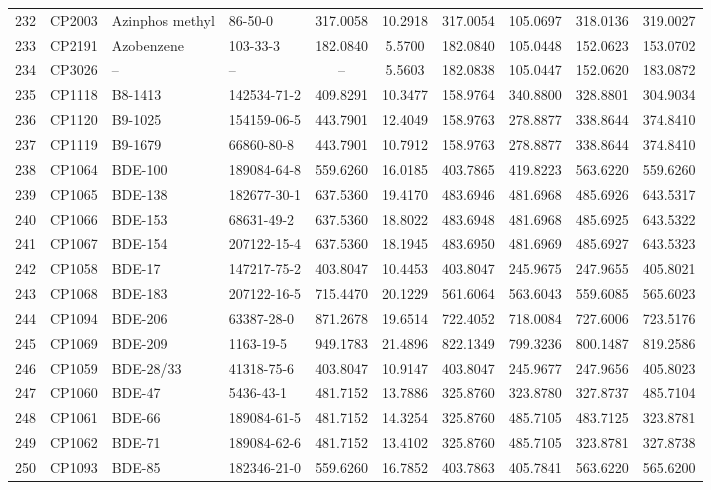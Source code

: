 \begin{longtable}{clllcccccc}
232 & CP2003 & Azinphos methyl & 86-50-0 & 317.0058 & 10.2918 & 317.0054 & 105.0697 & 318.0136 & 319.0027 \\ 
233 & CP2191 & Azobenzene & 103-33-3 & 182.0840 & 5.5700 & 182.0840 & 105.0448 & 152.0623 & 153.0702 \\ 
234 & CP3026 & – & – & – & 5.5603 & 182.0838 & 105.0447 & 152.0620 & 183.0872 \\ 
235 & CP1118 & B8-1413 & 142534-71-2 & 409.8291 & 10.3477 & 158.9764 & 340.8800 & 328.8801 & 304.9034 \\ 
236 & CP1120 & B9-1025 & 154159-06-5 & 443.7901 & 12.4049 & 158.9763 & 278.8877 & 338.8644 & 374.8410 \\ 
237 & CP1119 & B9-1679 & 66860-80-8 & 443.7901 & 10.7912 & 158.9763 & 278.8877 & 338.8644 & 374.8410 \\ 
238 & CP1064 & BDE-100 & 189084-64-8 & 559.6260 & 16.0185 & 403.7865 & 419.8223 & 563.6220 & 559.6260 \\ 
239 & CP1065 & BDE-138 & 182677-30-1 & 637.5360 & 19.4170 & 483.6946 & 481.6968 & 485.6926 & 643.5317 \\ 
240 & CP1066 & BDE-153 & 68631-49-2 & 637.5360 & 18.8022 & 483.6948 & 481.6968 & 485.6925 & 643.5322 \\ 
241 & CP1067 & BDE-154 & 207122-15-4 & 637.5360 & 18.1945 & 483.6950 & 481.6969 & 485.6927 & 643.5323 \\ 
242 & CP1058 & BDE-17 & 147217-75-2 & 403.8047 & 10.4453 & 403.8047 & 245.9675 & 247.9655 & 405.8021 \\ 
243 & CP1068 & BDE-183 & 207122-16-5 & 715.4470 & 20.1229 & 561.6064 & 563.6043 & 559.6085 & 565.6023 \\ 
244 & CP1094 & BDE-206 & 63387-28-0 & 871.2678 & 19.6514 & 722.4052 & 718.0084 & 727.6006 & 723.5176 \\ 
245 & CP1069 & BDE-209 & 1163-19-5 & 949.1783 & 21.4896 & 822.1349 & 799.3236 & 800.1487 & 819.2586 \\ 
246 & CP1059 & BDE-28/33 & 41318-75-6 & 403.8047 & 10.9147 & 403.8047 & 245.9677 & 247.9656 & 405.8023 \\ 
247 & CP1060 & BDE-47 & 5436-43-1 & 481.7152 & 13.7886 & 325.8760 & 323.8780 & 327.8737 & 485.7104 \\ 
248 & CP1061 & BDE-66 & 189084-61-5 & 481.7152 & 14.3254 & 325.8760 & 485.7105 & 483.7125 & 323.8781 \\ 
249 & CP1062 & BDE-71 & 189084-62-6 & 481.7152 & 13.4102 & 325.8760 & 485.7105 & 323.8781 & 327.8738 \\ 
250 & CP1093 & BDE-85 & 182346-21-0 & 559.6260 & 16.7852 & 403.7863 & 405.7841 & 563.6220 & 565.6200 \\ 

\end{longtable}
